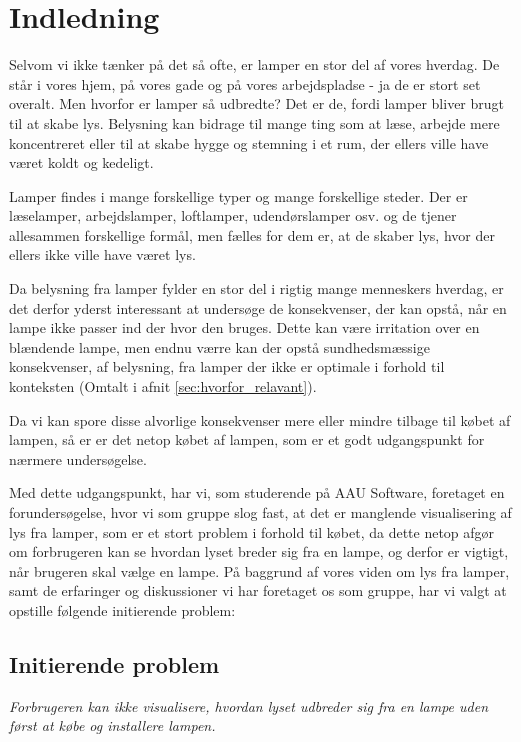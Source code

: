 \section{Indledning}
Selvom vi ikke tænker på det så ofte, er lamper en stor del af vores hverdag. De står i vores hjem, på vores gade og på vores arbejdspladse - ja de er stort set overalt. Men hvorfor er lamper så udbredte? Det er de, fordi lamper bliver brugt til at skabe lys. Belysning kan bidrage til mange ting som at læse, arbejde mere koncentreret eller til at skabe hygge og stemning i et rum, der ellers ville have været koldt og kedeligt. 

Lamper findes i mange forskellige typer og mange forskellige steder. Der er læselamper, arbejdslamper, loftlamper, udendørslamper osv. og de tjener allesammen forskellige formål, men fælles for dem er, at de skaber lys, hvor der ellers ikke ville have været lys. 

Da belysning fra lamper fylder en stor del i rigtig mange menneskers hverdag, er det derfor yderst interessant at undersøge de konsekvenser, der kan opstå, når en lampe ikke passer ind der hvor den bruges. Dette kan være irritation over en blændende lampe, men endnu værre kan der opstå sundhedsmæssige konsekvenser, af belysning, fra lamper der ikke er optimale i forhold til konteksten (Omtalt i afnit \ref{sec:hvorfor_relavant}).

Da vi kan spore disse alvorlige konsekvenser mere eller mindre tilbage til købet af lampen, så er er det netop købet af lampen, som er et godt udgangspunkt for nærmere undersøgelse.

Med dette udgangspunkt, har vi, som studerende på AAU Software, foretaget en forundersøgelse, hvor vi som gruppe slog fast, at det er manglende visualisering af lys fra lamper, som er et stort problem i forhold til købet, da dette netop afgør om forbrugeren kan se hvordan lyset breder sig fra en lampe, og derfor er vigtigt, når brugeren skal vælge en lampe. På baggrund af vores viden om lys fra lamper, samt de erfaringer og diskussioner vi har foretaget os som gruppe, har vi valgt at opstille følgende initierende problem:

\subsection{Initierende problem}
\textit{Forbrugeren kan ikke visualisere, hvordan lyset udbreder sig fra en lampe uden først at købe og installere lampen.}

\clearpage